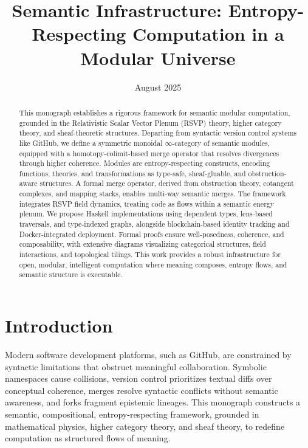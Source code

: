 \documentclass[12pt]{article}
\title{Semantic Infrastructure: Entropy-Respecting Computation in a Modular Universe}
\author{}
\date{August 2025}
\begin{document}
\maketitle

\begin{abstract}
This monograph establishes a rigorous framework for semantic modular computation, grounded in the Relativistic Scalar Vector Plenum (RSVP) theory, higher category theory, and sheaf-theoretic structures. Departing from syntactic version control systems like GitHub, we define a symmetric monoidal $\infty$-category of semantic modules, equipped with a homotopy-colimit-based merge operator that resolves divergences through higher coherence. Modules are entropy-respecting constructs, encoding functions, theories, and transformations as type-safe, sheaf-gluable, and obstruction-aware structures. A formal merge operator, derived from obstruction theory, cotangent complexes, and mapping stacks, enables multi-way semantic merges. The framework integrates RSVP field dynamics, treating code as flows within a semantic energy plenum. We propose Haskell implementations using dependent types, lens-based traversals, and type-indexed graphs, alongside blockchain-based identity tracking and Docker-integrated deployment. Formal proofs ensure well-posedness, coherence, and composability, with extensive diagrams visualizing categorical structures, field interactions, and topological tilings. This work provides a robust infrastructure for open, modular, intelligent computation where meaning composes, entropy flows, and semantic structure is executable.
\end{abstract}

\section{Introduction}
\label{sec:introduction}

Modern software development platforms, such as GitHub, are constrained by syntactic limitations that obstruct meaningful collaboration. Symbolic namespaces cause collisions, version control prioritizes textual diffs over conceptual coherence, merges resolve syntactic conflicts without semantic awareness, and forks fragment epistemic lineages. This monograph constructs a semantic, compositional, entropy-respecting framework, grounded in mathematical physics, higher category theory, and sheaf theory, to redefine computation as structured flows of meaning.
\end{document}
